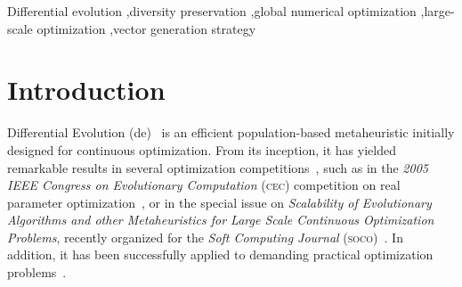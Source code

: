 \documentclass[review,3p]{elsarticle}
\newcommand{\DE}{{\sc de}}
\begin{document}
\begin{frontmatter}
\begin{keyword}
Differential evolution \sep diversity preservation \sep global numerical optimization \sep large-scale optimization \sep vector generation strategy
\end{keyword}

\end{frontmatter}

\linenumbers

\section{Introduction}
%
%
%
%
Differential Evolution (\DE{})~\cite{Storn:95} is an efficient population-based metaheuristic initially designed
for continuous optimization.
%
From its inception, it has yielded remarkable results in several optimization competitions~\cite{Das:11}, such as in 
%
%
the {\em 2005 IEEE Congress on Evolutionary Computation} (\textsc{cec}) competition on real parameter optimization~\cite{Das:05}, or in the special issue
on {\em Scalability of Evolutionary Algorithms and other Metaheuristics for Large Scale Continuous Optimization Problems},
recently organized for the {\em Soft Computing Journal} (\textsc{soco})~\cite{LaTorre:11}.
%
In addition, it has been successfully applied to demanding practical optimization problems~\cite{Zhao:14,Ghasemi:14}.
%
\end{document}
